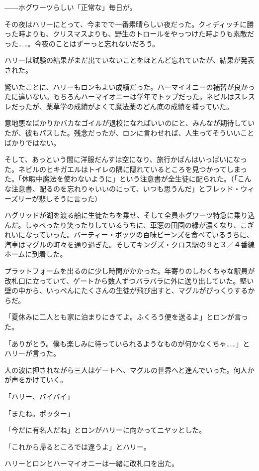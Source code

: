 \documentclass[10pt,a4paper]{article}
\begin{document}
\begin{CJK}{UTF8}{min}
――ホグワーツらしい「正常な」毎日が。

その夜はハリーにとって、今までで一番素晴らしい夜だった。クィディッチに勝った時よりも、クリスマスよりも、野生のトロールをやっつけた時よりも素敵だった……。今夜のことはずーっと忘れないだろう。



ハリーは試験の結果がまだ出ていないことをほとんど忘れていたが、結果が発表された。

驚いたことに、ハリーもロンもよい成績だった。ハーマイオニーの補習が良かったに違いない。もちろんハーマイオニーは学年でトップだった。ネビルはスレスレだったが、薬草学の成績がよくて魔法薬のどん底の成績を補っていた。

意地悪なばかりかバカなゴイルが退校になればいいのにと、みんなが期待していたが、彼もパスした。残念だったが、ロンに言わせれば、人生ってそういいことばかりではない。

そして、あっという間に洋服だんすは空になり、旅行かばんはいっぱいになった。ネビルのヒキガエルはトイレの隅に隠れているところを見つかってしまった。「休暇中魔法を使わないように」という注意書が全生徒に配られた。（「こんな注意書、配るのを忘れりゃいいのにって、いつも思うんだ」とフレッド・ウィーズリーが悲しそうに言った）

ハグリッドが湖を渡る船に生徒たちを乗せ、そして全員ホグワーツ特急に乗り込んだ。しゃべったり笑ったりしているうちに、車窓の田園の緑が濃くなり、こぎれいになっていった。バーティー・ボッツの百味ビーンズを食べているうちに、汽車はマグルの町々を通り過ぎた。そしてキングズ・クロス駅の９と３／４番線ホームに到着した。

プラットフォームを出るのに少し時間がかかった。年寄りのしわくちゃな駅員が改札口に立っていて、ゲートから数人ずつバラバラに外に送り出していた。堅い壁の中から、いっぺんにたくさんの生徒が飛び出すと、マグルがびっくりするからだ。

「夏休みに二人とも家に泊まりにきてよ。ふくろう便を送るよ」とロンが言った。

「ありがとう。僕も楽しみに待っていられるようなものが何かなくちゃ……」とハリーが言った。

人の波に押されながら三人はゲートへ、マグルの世界へと進んでいった。何人かが声をかけていく。

「ハリー、バイバイ」

「またね。ポッター」

「今だに有名人だね」とロンがハリーに向かってニヤッとした。

「これから帰るところでは違うよ」とハリー。

ハリーとロンとハーマイオニーは一緒に改札口を出た。


\end{CJK}
\end{document}
